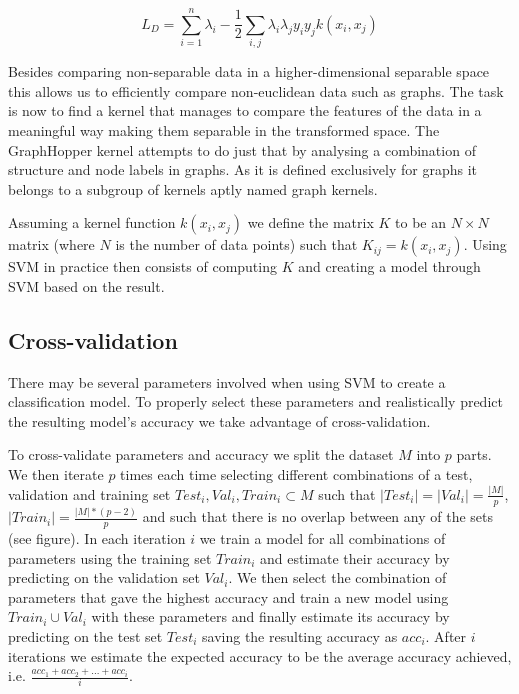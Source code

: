 \documentclass{article}
\begin{document}
\begin{equation}
\label{eq:kernel_function}
L_D = \sum_{i=1}^{n}\lambda_i-\frac{1}{2}\sum_{i,j}\lambda_i\lambda_j y_iy_jk(x_i,x_j)
\end{equation}

Besides comparing non-separable data in a higher-dimensional separable space this allows us to efficiently compare non-euclidean data such as graphs. The task is now to find a kernel that manages to compare the features of the data in a meaningful way making them separable in the transformed space. The GraphHopper kernel attempts to do just that by analysing a combination of structure and node labels in graphs. As it is defined exclusively for graphs it belongs to a subgroup of kernels aptly named graph kernels.

Assuming a kernel function $k(x_i,x_j)$ we define the matrix $K$ to be an $N\times N$ matrix (where $N$ is the number of data points) such that $K_{ij}=k(x_i,x_j)$. Using SVM in practice then consists of computing $K$ and creating a model through SVM based on the result.

\subsection{Cross-validation}
There may be several parameters involved when using SVM to create a classification model. To properly select these parameters and realistically predict the resulting model's accuracy we take advantage of cross-validation.

To cross-validate parameters and accuracy we split the dataset $M$ into $p$ parts. We then iterate $p$ times each time selecting different combinations of a test, validation and training set $Test_i, Val_i, Train_i\subset M$ such that $|Test_i|=|Val_i|=\frac{|M|}{p}$,  $|Train_i| = \frac{|M| * (p-2)}{p}$ and such that there is no overlap between any of the sets (see figure). In each iteration $i$ we train a model for all combinations of parameters using the training set $Train_i$ and estimate their accuracy by predicting on the validation set $Val_i$. We then select the combination of parameters that gave the highest accuracy and train a new model using $Train_i\cup Val_i$ with these parameters and finally estimate its accuracy by predicting on the test set $Test_i$ saving the resulting accuracy as $acc_i$. After $i$ iterations we estimate the expected accuracy to be the average accuracy achieved, i.e. $\frac{acc_1 + acc_2 + ... + acc_i}{i}$.
\end{document}
